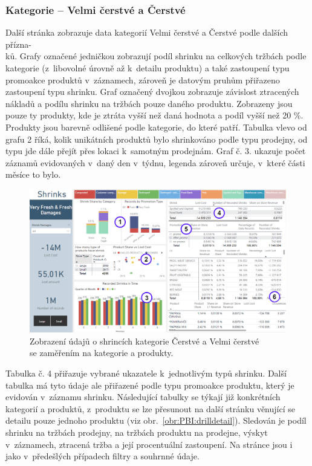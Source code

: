 \subsubsection*{Kategorie -- Velmi čerstvé a Čerstvé}

Další stránka zobrazuje data kategorií Velmi čerstvé a Čerstvé podle dalších přízna-\\ků. Grafy označené jedničkou zobrazují podíl shrinku na celkových tržbách podle kategorie (z~libovolné úrovně až k~detailu produktu) a také zastoupení typu promoakce produktů v~záznamech, zároveň je datovým pruhům přiřazeno zastoupení typu shrinku. Graf označený dvojkou zobrazuje závislost ztracených nákladů a podílu shrinku na tržbách pouze daného produktu. Zobrazeny jsou pouze ty produkty, kde je ztráta vyšší než daná hodnota a podíl vyšší než 20 \%. Produkty jsou barevně odlišené podle kategorie, do které patří. Tabulka vlevo od grafu 2 říká, kolik unikátních produktů bylo shrinkováno podle typu prodejny, od typu jde dále přejít přes lokaci k~samotným prodejnám. Graf č. 3. ukazuje počet záznamů evidovaných v~daný den v~týdnu, legenda zároveň určuje, v~které části měsíce to bylo. 

\begin{figure}[h!]
    \centering
    \captionsetup{justification=centering}
    \includegraphics[width=\textwidth]{obrazky/PBI/levelsSFFkopie.png}
    \caption{Zobrazení údajů o shrincích kategorie Čerstvé a Velmi čerstvé \\ se zaměřením na kategorie a produkty.}
    \label{obr:PBI:levelsSFF}
\end{figure}

Tabulka č. 4 přiřazuje vybrané ukazatele k~jednotlivým typů shrinku. Další tabulka má tyto údaje ale přiřazené podle typu promoakce produktu, který je evidován v~záznamu shrinku. Následující tabulky se týkají již konkrétních kategorií a produktů, z~produktu se lze přesunout na další stránku věnující se detailu pouze jednoho produktu (viz obr.~\ref*{obr:PBI:drilldetail}). Sledován je podíl shrinku na tržbách prodejny, na tržbách produktu na prodejne, výskyt v~záznamech, ztracená tržba a její procentuální zastoupení. Na stránce jsou i jako v~předešlých případech filtry a souhrnné údaje.

